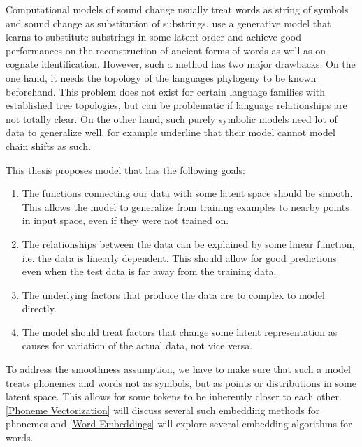 \documentclass[6pt]{article}
\begin{document}
Computational models of sound change usually treat words as string of symbols and sound change as substitution of substrings.\cite{bouchard2007probabilistic,bouchard2013automated} use a generative model that learns to substitute substrings in some latent order and achieve good performances on the reconstruction of ancient forms of words as well as on cognate identification. However, such a method has two major drawbacks: On the one hand, it needs the topology of the languages phylogeny to be known beforehand. This problem does not exist for certain language families with established tree topologies, but can be problematic if language relationships are not totally clear. On the other hand, such purely symbolic models need lot of data to generalize well. \cite{bouchard2007probabilistic} for example underline that their model cannot model chain shifts as such.

This thesis proposes model that has the following goals:
\begin{enumerate}
\item The functions connecting our data with some latent space should be smooth. This allows the model to generalize from training examples to nearby points in input space, even if they were not trained on.
\item The relationships between the data can be explained by some linear function, i.e. the data is linearly dependent. This should allow for good predictions even when the test data is far away from the training data.
\item The underlying factors that produce the data are to complex to model directly. 
\item The model should treat factors that change some latent representation as causes for variation of the actual data, not vice versa.
\end{enumerate}

To address the smoothness assumption, we have to make sure that such a model treats phonemes and words not as symbols, but as points or distributions in some latent space. This allows for some tokens to be inherently closer to each other. \ref{Phoneme Vectorization} will discuss several such embedding methods for phonemes and \ref{Word Embeddings} will explore several embedding algorithms for words.  




\end{document}
